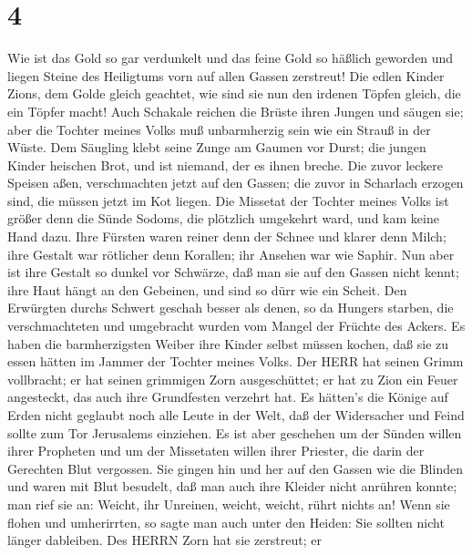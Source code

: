 \hypertarget{section-3}{%
\section{4}\label{section-3}}

 Wie ist das Gold so gar verdunkelt und das feine Gold so
häßlich geworden und liegen Steine des Heiligtums vorn auf allen Gassen
zerstreut!  Die edlen Kinder Zions, dem Golde gleich
geachtet, wie sind sie nun den irdenen Töpfen gleich, die ein Töpfer
macht!  Auch Schakale reichen die Brüste ihren Jungen und
säugen sie; aber die Tochter meines Volks muß unbarmherzig sein wie ein
Strauß in der Wüste.  Dem Säugling klebt seine Zunge am
Gaumen vor Durst; die jungen Kinder heischen Brot, und ist niemand, der
es ihnen breche.  Die zuvor leckere Speisen aßen,
verschmachten jetzt auf den Gassen; die zuvor in Scharlach erzogen sind,
die müssen jetzt im Kot liegen.  Die Missetat der Tochter
meines Volks ist größer denn die Sünde Sodoms, die plötzlich umgekehrt
ward, und kam keine Hand dazu.  Ihre Fürsten waren reiner
denn der Schnee und klarer denn Milch; ihre Gestalt war rötlicher denn
Korallen; ihr Ansehen war wie Saphir.  Nun aber ist ihre
Gestalt so dunkel vor Schwärze, daß man sie auf den Gassen nicht kennt;
ihre Haut hängt an den Gebeinen, und sind so dürr wie ein Scheit.
 Den Erwürgten durchs Schwert geschah besser als denen, so
da Hungers starben, die verschmachteten und umgebracht wurden vom Mangel
der Früchte des Ackers.  Es haben die barmherzigsten Weiber
ihre Kinder selbst müssen kochen, daß sie zu essen hätten im Jammer der
Tochter meines Volks.  Der HERR hat seinen Grimm
vollbracht; er hat seinen grimmigen Zorn ausgeschüttet; er hat zu Zion
ein Feuer angesteckt, das auch ihre Grundfesten verzehrt hat.
 Es hätten's die Könige auf Erden nicht geglaubt noch alle
Leute in der Welt, daß der Widersacher und Feind sollte zum Tor
Jerusalems einziehen.  Es ist aber geschehen um der Sünden
willen ihrer Propheten und um der Missetaten willen ihrer Priester, die
darin der Gerechten Blut vergossen.  Sie gingen hin und her
auf den Gassen wie die Blinden und waren mit Blut besudelt, daß man auch
ihre Kleider nicht anrühren konnte;  man rief sie an:
Weicht, ihr Unreinen, weicht, weicht, rührt nichts an! Wenn sie flohen
und umherirrten, so sagte man auch unter den Heiden: Sie sollten nicht
länger dableiben.  Des HERRN Zorn hat sie zerstreut; er
